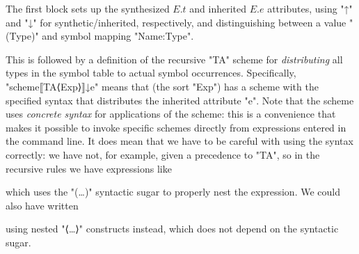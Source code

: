 \documentclass[11pt]{article} %
\begin{document}
\begin{example}

  The first block sets up the synthesized $E.t$ and inherited $E.e$ attributes, using
  "↑" and "↓" for synthetic/inherited, respectively, and distinguishing between a value "(Type)" and
  symbol mapping "{Name:Type}".

  This is followed by a definition of the recursive "TA" scheme for \emph{distributing} all types in
  the symbol table to actual symbol occurrences. Specifically, "scheme⟦TA⟨Exp⟩⟧↓e" means that (the
  sort "Exp") has a scheme with the specified syntax that distributes the inherited attribute "e".
  Note that the scheme uses \emph{concrete syntax} for applications of the scheme: this is a
  convenience that makes it possible to invoke specific schemes directly from expressions entered in
  the command line. It does mean that we have to be careful with using the syntax correctly: we have
  not, for example, given a precedence to "TA", so in the recursive rules we have expressions like
  which uses the "(…)" syntactic sugar to properly nest the expression.  We could also have written
  using nested "⟨…⟩" constructs instead, which does not depend on the syntactic sugar.


\end{example}
\end{document}
